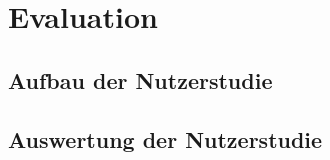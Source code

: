 
\chapter{Evaluation}
\label{chapter:evaluation}

\section{Aufbau der Nutzerstudie}



\section{Auswertung der Nutzerstudie}


